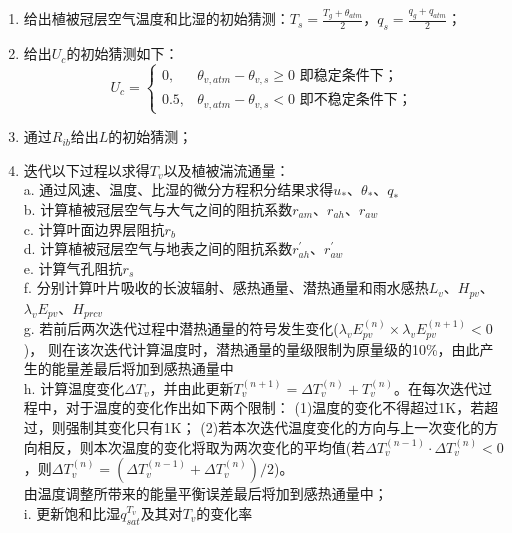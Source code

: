 \begin{enumerate}
    \item 给出植被冠层空气温度和比湿的初始猜测：$T_s=\frac{T_g+\theta_{atm}}{2}$，$q_s=\frac{q_g+q_{atm}}{2}$；
    \item 给出$U_c$的初始猜测如下：\\
    \begin{equation*}
    U_c= \begin{cases}
      0,  & \theta_{v,atm}-\theta_{v,s}\geq0 \text{ 即稳定条件下；} \\
      0.5, & \theta_{v,atm}-\theta_{v,s}<0 \text{ 即不稳定条件下；}
     \end{cases}
    \end{equation*}
    \item 通过$R_{ib}$给出$L$的初始猜测；
    \item 迭代以下过程以求得$T_v$以及植被湍流通量：\\
    a. 通过风速、温度、比湿的微分方程积分结果求得$u_\ast$、$\theta_\ast$、$q_\ast$ \\
    b. 计算植被冠层空气与大气之间的阻抗系数$r_{am}$、$r_{ah}$、$r_{aw}$ \\
    c. 计算叶面边界层阻抗$r_b$ \\
    d. 计算植被冠层空气与地表之间的阻抗系数$r_{ah}^\prime$、$r_{aw}^\prime$ \\
    e. 计算气孔阻抗$r_s$ \\
    f. 分别计算叶片吸收的长波辐射、感热通量、潜热通量和雨水感热$L_v$、$H_{pv}$、$\lambda_vE_{pv}$、$H_{prcv}$ \\
    g. 若前后两次迭代过程中潜热通量的符号发生变化($\lambda_vE_{pv}^{\left(n\right)}\times\lambda_vE_{pv}^{\left(n+1\right)}<0$)，
    则在该次迭代计算温度时，潜热通量的量级限制为原量级的10\%，由此产生的能量差最后将加到感热通量中 \\
    h. 计算温度变化$\Delta T_v$，并由此更新$T_v^{\left(n+1\right)}=\Delta T_v^{\left(n\right)}+T_v^{\left(n\right)}$。在每次迭代过程中，对于温度的变化作出如下两个限制：
    (1)温度的变化不得超过1K，若超过，则强制其变化只有1K；
    (2)若本次迭代温度变化的方向与上一次变化的方向相反，则本次温度的变化将取为两次变化的平均值(若$\Delta T_v^{\left(n-1\right)} \cdot \Delta T_v^{\left(n\right)}<0$，则$\Delta T_v^{\left(n\right)}=\left(\Delta T_v^{\left(n-1\right)}+\Delta T_v^{\left(n\right)}\right)/2$)。\\
    由温度调整所带来的能量平衡误差最后将加到感热通量中；\\
    i. 更新饱和比湿$q_{sat}^{T_v}$及其对$T_v$的变化率 \\

\end{enumerate}
